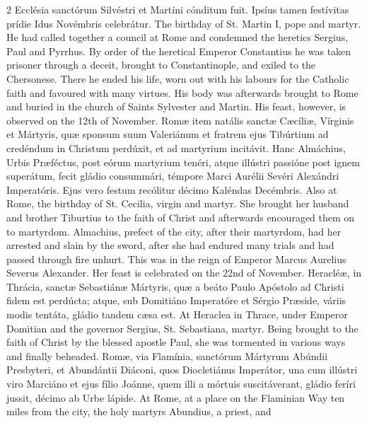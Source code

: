 \begin{paracol}{2}
 Ecclésia sanctórum Silvéstri et Martíni cónditum fuit. Ipsíus tamen 
 festívitas prídie Idus Novémbris celebrátur.
\switchcolumn
{}
The birthday of St. Martin I, pope 
 and martyr. He had called together a council at Rome and condemned the 
 heretics Sergius, Paul and Pyrrhus. By order of the heretical Emperor 
 Constantius he was taken prisoner through a deceit, brought to 
 Constantinople, and exiled to the Chersonese. There he ended his life, 
 worn out with his labours for the Catholic faith and favoured with many 
 virtues. His body was afterwards brought to Rome and buried in the 
 church of Saints Sylvester and Martin. His feast, however, is observed 
 on the 12th of November.
\switchcolumn*
{}
Romæ item natális 
 sanctæ Cæcíliæ, Vírginis et Mártyris, quæ sponsum suum Valeriánum et fratrem 
 ejus Tibúrtium ad credéndum in Christum perdúxit, et ad martyrium incitávit. 
 Hanc Almáchius, Urbis Præféctus, post eórum martyrium tenéri, atque illústri 
 passióne post ignem superátum, fecit gládio consummári, témpore Marci 
 Aurélii Sevéri Alexándri Imperatóris. Ejus vero festum recólitur décimo Kaléndas Decémbris.
\switchcolumn
{}
Also at Rome, the birthday of St. 
 Cecilia, virgin and martyr. She brought her husband and brother 
 Tiburtius to the faith of Christ and afterwards encouraged them on to 
 martyrdom. Almachius, prefect of the city, after their martyrdom, had 
 her arrested and slain by the sword, after she had endured many trials and 
 had passed through fire unhurt. This was in the reign of Emperor 
 Marcus Aurelius Severus Alexander. Her feast is celebrated on the 22nd 
 of November.
\switchcolumn*
{}
Heracléæ, in Thrácia, 
 sanctæ Sebastiánæ Mártyris, quæ a beáto Paulo Apóstolo ad Christi fidem est 
 perdúcta; atque, sub Domitiáno Imperatóre et Sérgio Præside, váriis modis 
 tentáta, gládio tandem cæsa est.
\switchcolumn
{}
At Heraclea in Thrace, under Emperor 
 Domitian and the governor Sergius, St. Sebastiana, martyr. Being 
 brought to the faith of Christ by the blessed apostle Paul, she was 
 tormented in various ways and finally beheaded.
\switchcolumn*
{}
Romæ, via Flamínia, 
 sanctórum Mártyrum Abúndii Presbyteri, et Abundántii Diáconi, quos 
 Diocletiánus Imperátor, una cum illústri viro Marciáno et ejus fílio Joánne, 
 quem illi a mórtuis suscitáverant, gládio feríri jussit, décimo ab Urbe 
 lápide.
\switchcolumn
{}
At Rome, at a place on the Flaminian 
 Way ten miles from the city, the holy martyrs Abundius, a priest, and 

\end{paracol}
